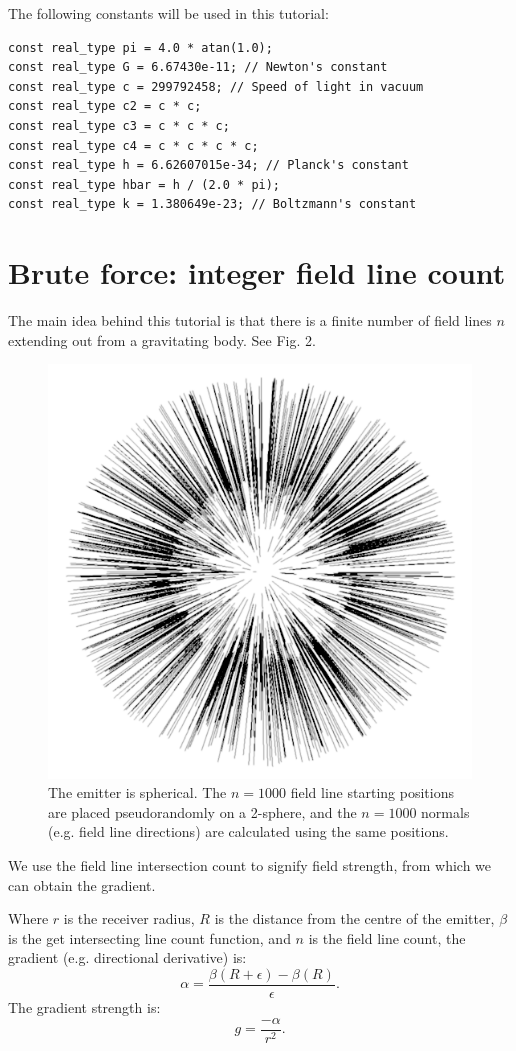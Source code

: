 \documentclass[12pt]{article}
\begin{document}
The following constants will be used in this tutorial:
\begin{lstlisting}
const real_type pi = 4.0 * atan(1.0);
const real_type G = 6.67430e-11; // Newton's constant
const real_type c = 299792458; // Speed of light in vacuum
const real_type c2 = c * c;
const real_type c3 = c * c * c;
const real_type c4 = c * c * c * c;
const real_type h = 6.62607015e-34; // Planck's constant
const real_type hbar = h / (2.0 * pi);
const real_type k = 1.380649e-23; // Boltzmann's constant
\end{lstlisting}



\section{Brute force: integer field line count}

The main idea behind this tutorial is that there is a finite number of field lines $n$ extending out from a gravitating body.
See Fig. 2.
\begin{figure} 
\centering
  \includegraphics[width = 3 in]{3.png}
  \caption{
The emitter is spherical.
The $n = 1000$ field line starting positions are placed pseudorandomly on a 2-sphere, and the $n = 1000$ normals (e.g. field line directions) are calculated using the same positions.
}
\end{figure}

We use the field line intersection count to signify field strength, from which we can obtain the gradient.

Where $r$ is the receiver radius, $R$ is the distance from the centre of the emitter, $\beta$ is the get intersecting line count function, and $n$ is the field line count, the gradient (e.g. directional derivative) is:
\begin{equation}
\alpha = \frac{\beta(R + \epsilon) - \beta(R)}{\epsilon}.
\end{equation}
The gradient strength is:
\begin{equation}
g = \frac{-\alpha}{r^2}.
\end{equation}
\end{document}
